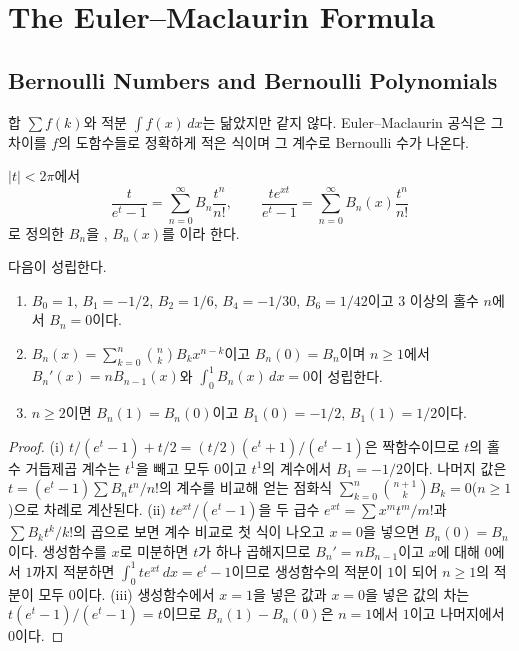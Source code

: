 \section{The Euler--Maclaurin Formula}
\label{sec:euler-maclaurin}

\subsection{Bernoulli Numbers and Bernoulli Polynomials}

합 $\sum f(k)$와 적분 $\int f(x)\,dx$는 닮았지만 같지 않다. Euler--Maclaurin 공식은 그 차이를 $f$의 도함수들로 정확하게 적은 식이며 그 계수로 Bernoulli 수가 나온다.

\begin{definition}
\label{def:bernoulli}
$|t|<2\pi$에서
\[
\frac{t}{e^t-1}=\sum_{n=0}^\infty B_n\frac{t^n}{n!},\qquad\frac{te^{xt}}{e^t-1}=\sum_{n=0}^\infty B_n(x)\frac{t^n}{n!}
\]
로 정의한 $B_n$을 , $B_n(x)$를 이라 한다.
\end{definition}

\begin{proposition}
\label{prop:bernoulli}
다음이 성립한다.
\begin{enumerate}
\item $B_0=1$, $B_1=-1/2$, $B_2=1/6$, $B_4=-1/30$, $B_6=1/42$이고 $3$ 이상의 홀수 $n$에서 $B_n=0$이다.
\item $B_n(x)=\sum_{k=0}^n\binom nkB_kx^{n-k}$이고 $B_n(0)=B_n$이며 $n\ge1$에서 $B_n'(x)=nB_{n-1}(x)$와 $\int_0^1B_n(x)\,dx=0$이 성립한다.
\item $n\ge2$이면 $B_n(1)=B_n(0)$이고 $B_1(0)=-1/2$, $B_1(1)=1/2$이다.
\end{enumerate}
\end{proposition}

\begin{proof}
(i) $t/(e^t-1)+t/2=(t/2)(e^t+1)/(e^t-1)$은 짝함수이므로 $t$의 홀수 거듭제곱 계수는 $t^1$을 빼고 모두 $0$이고 $t^1$의 계수에서 $B_1=-1/2$이다. 나머지 값은 $t=(e^t-1)\sum B_nt^n/n!$의 계수를 비교해 얻는 점화식 $\sum_{k=0}^{n}\binom{n+1}kB_k=0$($n\ge1$)으로 차례로 계산된다. (ii) $te^{xt}/(e^t-1)$을 두 급수 $e^{xt}=\sum x^mt^m/m!$과 $\sum B_kt^k/k!$의 곱으로 보면 계수 비교로 첫 식이 나오고 $x=0$을 넣으면 $B_n(0)=B_n$이다. 생성함수를 $x$로 미분하면 $t$가 하나 곱해지므로 $B_n'=nB_{n-1}$이고 $x$에 대해 $0$에서 $1$까지 적분하면 $\int_0^1te^{xt}\,dx=e^t-1$이므로 생성함수의 적분이 $1$이 되어 $n\ge1$의 적분이 모두 $0$이다. (iii) 생성함수에서 $x=1$을 넣은 값과 $x=0$을 넣은 값의 차는 $t(e^t-1)/(e^t-1)=t$이므로 $B_n(1)-B_n(0)$은 $n=1$에서 $1$이고 나머지에서 $0$이다.
\end{proof}

